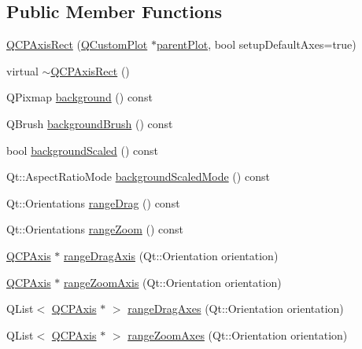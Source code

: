 \subsection*{Public Member Functions}
\begin{DoxyCompactItemize}
\item 
\mbox{\hyperlink{class_q_c_p_axis_rect_a60b31dece805462c1b82eea2e69ba042}{Q\+C\+P\+Axis\+Rect}} (\mbox{\hyperlink{class_q_custom_plot}{Q\+Custom\+Plot}} $\ast$\mbox{\hyperlink{class_q_c_p_layerable_a473edb813a4c1929d6b6a8fe3ff3faf7}{parent\+Plot}}, bool setup\+Default\+Axes=true)
\item 
virtual \mbox{\hyperlink{class_q_c_p_axis_rect_a463c44b1856ddbf82eb3f7b582839cd0}{$\sim$\+Q\+C\+P\+Axis\+Rect}} ()
\item 
Q\+Pixmap \mbox{\hyperlink{class_q_c_p_axis_rect_a572deec9c9a4d5987d5c5f78521991e6}{background}} () const
\item 
Q\+Brush \mbox{\hyperlink{class_q_c_p_axis_rect_a7d09540e3fef12362d00e6bac92b6453}{background\+Brush}} () const
\item 
bool \mbox{\hyperlink{class_q_c_p_axis_rect_a059ede9a5fdcafb5cef280cd65fe4f3a}{background\+Scaled}} () const
\item 
Qt\+::\+Aspect\+Ratio\+Mode \mbox{\hyperlink{class_q_c_p_axis_rect_a06b98faf54b5491bff780294e423d3ff}{background\+Scaled\+Mode}} () const
\item 
Qt\+::\+Orientations \mbox{\hyperlink{class_q_c_p_axis_rect_aa3a84c768ad6edd08fd4c5dec176828f}{range\+Drag}} () const
\item 
Qt\+::\+Orientations \mbox{\hyperlink{class_q_c_p_axis_rect_aa0d8414ef040523f8b2d55f0c0bddbee}{range\+Zoom}} () const
\item 
\mbox{\hyperlink{class_q_c_p_axis}{Q\+C\+P\+Axis}} $\ast$ \mbox{\hyperlink{class_q_c_p_axis_rect_a6d7c22cfc54fac7a3d6ef80b133a8574}{range\+Drag\+Axis}} (Qt\+::\+Orientation orientation)
\item 
\mbox{\hyperlink{class_q_c_p_axis}{Q\+C\+P\+Axis}} $\ast$ \mbox{\hyperlink{class_q_c_p_axis_rect_a679c63f2b8daccfe6ec5110dce3dd3b6}{range\+Zoom\+Axis}} (Qt\+::\+Orientation orientation)
\item 
Q\+List$<$ \mbox{\hyperlink{class_q_c_p_axis}{Q\+C\+P\+Axis}} $\ast$ $>$ \mbox{\hyperlink{class_q_c_p_axis_rect_aae5f99a044ca911685a306f01b7ff941}{range\+Drag\+Axes}} (Qt\+::\+Orientation orientation)
\item 
Q\+List$<$ \mbox{\hyperlink{class_q_c_p_axis}{Q\+C\+P\+Axis}} $\ast$ $>$ \mbox{\hyperlink{class_q_c_p_axis_rect_a86aac0f435f209d60dacd22cda10c104}{range\+Zoom\+Axes}} (Qt\+::\+Orientation orientation)

\end{DoxyCompactItemize}
